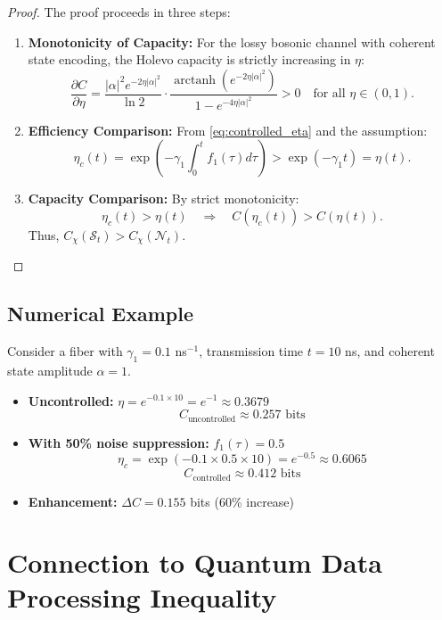 \documentclass[11pt]{article}
\begin{document}
\begin{proof}
The proof proceeds in three steps:

\begin{enumerate}
\item \textbf{Monotonicity of Capacity:} For the lossy bosonic channel with coherent state encoding, the Holevo capacity is strictly increasing in $\eta$:
\[
\frac{\partial C}{\partial \eta} = \frac{|\alpha|^2 e^{-2\eta|\alpha|^2}}{\ln 2} \cdot \frac{\operatorname{arctanh}\left( e^{-2\eta|\alpha|^2} \right)}{1 - e^{-4\eta|\alpha|^2}} > 0 \quad \text{for all } \eta \in (0,1).
\]

\item \textbf{Efficiency Comparison:} From \eqref{eq:controlled_eta} and the assumption:
\[
\eta_c(t) = \exp\left( -\gamma_1 \int_0^t f_1(\tau) d\tau \right) > \exp\left( -\gamma_1 t \right) = \eta(t).
\]

\item \textbf{Capacity Comparison:} By strict monotonicity:
\[
\eta_c(t) > \eta(t) \quad \Rightarrow \quad C(\eta_c(t)) > C(\eta(t)).
\]
Thus, $C_\chi(\mathcal{S}_t) > C_\chi(\mathcal{N}_t)$.
\end{enumerate}
\end{proof}

\subsection{Numerical Example}
Consider a fiber with $\gamma_1 = 0.1$ ns$^{-1}$, transmission time $t = 10$ ns, and coherent state amplitude $\alpha = 1$.

\begin{itemize}
\item \textbf{Uncontrolled:} $\eta = e^{-0.1 \times 10} = e^{-1} \approx 0.3679$
\[
C_{\text{uncontrolled}} \approx 0.257 \text{ bits}
\]

\item \textbf{With 50\% noise suppression:} $f_1(\tau) = 0.5$
\[
\eta_c = \exp\left( -0.1 \times 0.5 \times 10 \right) = e^{-0.5} \approx 0.6065
\]
\[
C_{\text{controlled}} \approx 0.412 \text{ bits}
\]

\item \textbf{Enhancement:} $\Delta C = 0.155$ bits (60\% increase)
\end{itemize}

\section{Connection to Quantum Data Processing Inequality}
\end{document}
